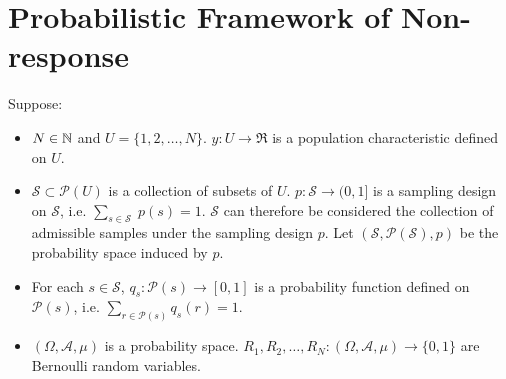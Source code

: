 

\section{Probabilistic Framework of Non-response}
\setcounter{theorem}{0}
\setcounter{equation}{0}


\renewcommand{\theenumi}{\roman{enumi}}
\renewcommand{\labelenumi}{\textnormal{(\theenumi)}$\;\;$}


Suppose:
\begin{itemize}
\item
	$N \in \mathbb{N}$ and $U = \{1,2,\ldots,N\}$.
	\vskip 0.05cm
	$y : U \longrightarrow \Re$ is a population characteristic defined on $U$.
\item
	$\mathcal{S} \subset \mathcal{P}(U)$ is a collection of subsets of $U$.
	$p : \mathcal{S} \longrightarrow (0,1]$ is a sampling design on $\mathcal{S}$,
	i.e. $\underset{s\in\mathcal{S}}{\sum}\;p(s) = 1$.
	\vskip 0.05cm
	$\mathcal{S}$ can therefore be considered the collection of admissible samples under the sampling design $p$.
	\vskip 0.05cm
	Let $(\mathcal{S},\mathcal{P}(\mathcal{S}),p)$ be the probability space induced by $p$.
\item
	For each $s \in \mathcal{S}$, $q_{s} : \mathcal{P}(s) \longrightarrow [0,1]$
	is a probability function defined on $\mathcal{P}(s)$,
	i.e. $\underset{r\in\mathcal{P}(s)}{\sum}q_{s}(r) = 1$.
\item
	$(\Omega,\mathcal{A},\mu)$ is a probability space.
	\vskip 0.05cm
	$R_{1}, R_{2}, \ldots, R_{N} : (\Omega,\mathcal{A},\mu) \longrightarrow \{0,1\}$
	are Bernoulli random variables.
\end{itemize}


\renewcommand{\theenumi}{\roman{enumi}}
\renewcommand{\labelenumi}{\textnormal{(\theenumi)}$\;\;$}


